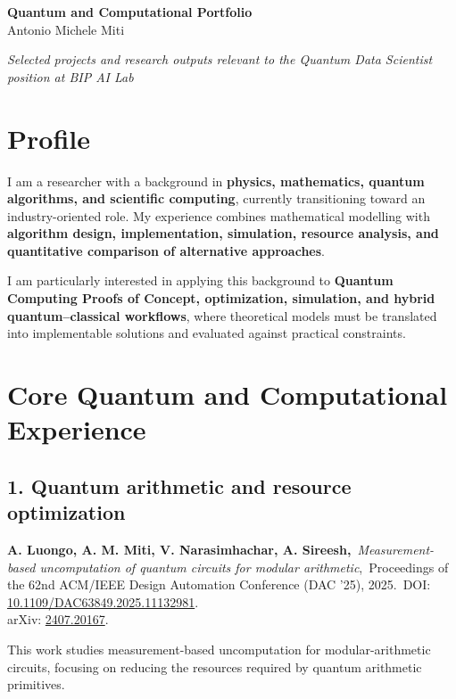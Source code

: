 \documentclass[10pt,a4paper]{article}
\begin{document}
\begin{center}
{\Large \textbf{Quantum and Computational Portfolio}} \\[3pt] 
{\large Antonio Michele Miti} \\[3pt]
\parbox{0.9\textwidth}{\centering
\textit{Selected projects and research outputs relevant to the
Quantum Data Scientist position at BIP AI Lab}}
\end{center}

\vspace{0.5em}

\section*{Profile}

I am a researcher with a background in \textbf{physics, mathematics, quantum algorithms, and scientific computing},
currently transitioning toward an industry-oriented role. My experience combines mathematical modelling with
\textbf{algorithm design, implementation, simulation, resource analysis, and quantitative comparison of alternative approaches}.

I am particularly interested in applying this background to \textbf{Quantum Computing Proofs of Concept, optimization,
simulation, and hybrid quantum--classical workflows}, where theoretical models must be translated into implementable
solutions and evaluated against practical constraints.

\section*{Core Quantum and Computational Experience}

\subsection*{1. Quantum arithmetic and resource optimization}

\textbf{A. Luongo, A. M. Miti, V. Narasimhachar, A. Sireesh,}\
\textit{Measurement-based uncomputation of quantum circuits for modular arithmetic},\
Proceedings of the 62nd ACM/IEEE Design Automation Conference (DAC '25), 2025.\
DOI: \href{https://doi.org/10.1109/DAC63849.2025.11132981}{10.1109/DAC63849.2025.11132981}.\\
arXiv: \href{https://arxiv.org/abs/2407.20167}{2407.20167}.

This work studies measurement-based uncomputation for modular-arithmetic circuits, focusing on reducing the resources
required by quantum arithmetic primitives.
\end{document}

